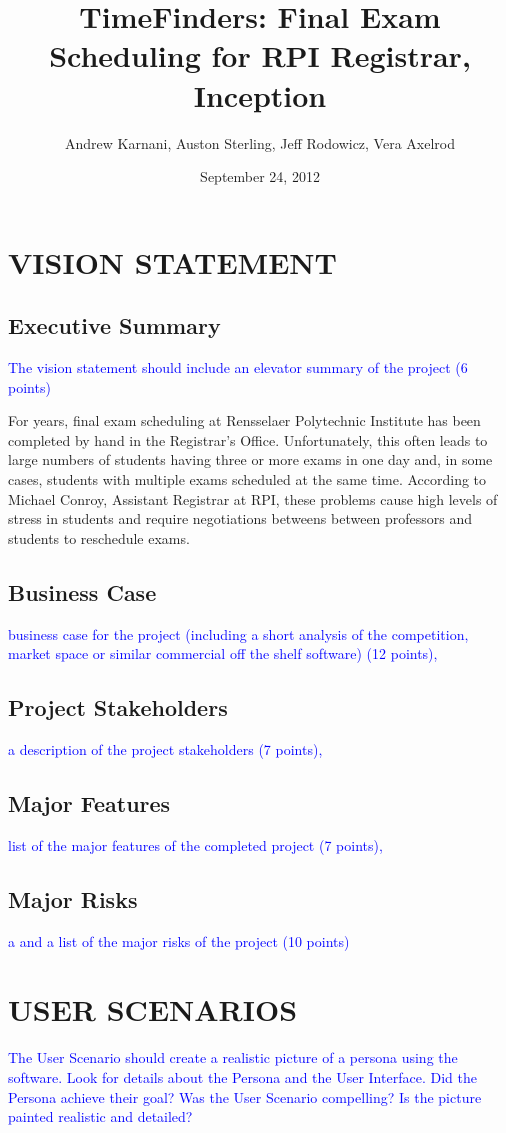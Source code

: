 \documentclass[11pt]{article}
\author{Andrew Karnani, Auston Sterling, Jeff Rodowicz, Vera Axelrod}
\title{TimeFinders: Final Exam Scheduling for RPI Registrar, Inception}
\date{September 24, 2012}
\begin{document}
\maketitle

\section{VISION STATEMENT}
\subsection{Executive Summary} %
\textcolor{blue}{The vision statement should include an elevator summary of the project (6 points)}

For years, final exam scheduling at Rensselaer Polytechnic Institute has been completed by hand in the Registrar’s Office. Unfortunately, this often leads to large numbers of students having three or more exams in one day and, in some cases, students with multiple exams scheduled at the same time.  According to Michael Conroy, Assistant Registrar at RPI, these problems cause high levels of stress in students and require negotiations betweens between professors and students to reschedule exams.

\subsection{Business Case} %
\textcolor{blue}{ business case for the project (including a short analysis of the competition, market space or similar commercial off the shelf software) (12 points),}
\subsection{Project Stakeholders} %
\textcolor{blue}{a description of the project stakeholders (7 points),}
\subsection{Major Features} %
\textcolor{blue}{ list of the major features of the completed project (7 points),}
\subsection{Major Risks} %
\textcolor{blue}{a and a list of the major risks of the project (10 points)}


\section{USER SCENARIOS}  %
\textcolor{blue}{The User Scenario should create a realistic picture of a persona using the software.  Look for details about the Persona and the User Interface.  Did the Persona achieve their goal?  Was the User Scenario compelling?  Is the picture painted realistic and detailed?}
\end{document}

